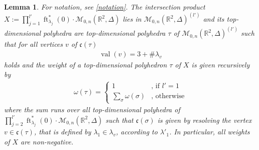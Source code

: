 \documentclass[11pt,reqno,a4]{amsart}
\theoremstyle{dotless}
\newtheorem{lemma}[corollary]{Lemma}
\theoremstyle{definition}
\newcommand{\ft}{\operatorname{ft}}
\newcommand{\val}{\operatorname{val}}
\begin{document}
\begin{lemma}\label{lemma:description_of_X}
For notation, see \ref{notation}. The intersection product $X:=\prod_{j=1}^{l'}\ft_{\lambda_j}^*\left( 0\right)\cdot\mathcal{M}_{0,n}\left(\mathbb{R}^2,\Delta \right)$ lies in $\mathcal{M}_{0,n}\left(\mathbb{R}^2,\Delta \right)^{(l')}$ and its top-dimensional polyhedra are top-dimensional polyhedra $\tau$ of $\mathcal{M}_{0,n}\left(\mathbb{R}^2,\Delta \right)^{(l')}$ such that for all vertices $v$ of $\mathfrak{c}(\tau)$
\begin{align*}
\val(v)=3+\#\lambda_v
\end{align*}  
holds and the weight of a top-dimensional polyhedron $\tau$ of $X$ is given recursively by
\begin{align*}
\omega(\tau)=
\begin{cases}
1 & \textrm{, if $l'=1$}\\
\sum_\sigma \omega(\sigma) & \textrm{, otherwise}
\end{cases}
\end{align*}
where the sum runs over all top-dimensional polyhedra of $\prod_{j=2}^{l'}\ft_{\lambda_j}^*\left( 0\right)\cdot\mathcal{M}_{0,n}\left(\mathbb{R}^2,\Delta \right)$ such that $\mathfrak{c}(\sigma)$ is given by resolving the vertex $v\in\mathfrak{c}(\tau)$, that is defined by $\lambda_1\in\lambda_v$, according to $\lambda'_1$. In particular, all weights of $X$ are non-negative.
\end{lemma}
\end{document}
